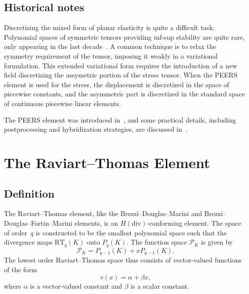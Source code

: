 

\subsection{Historical notes}

Discretizing the mixed form of planar elasticity is quite a difficult
task.  Polynomial spaces of symmetric tensors providing inf-sup
stability are quite rare, only appearing in the last
decade~\cite{ArnoldWinther2002}. A common technique is to relax the
symmetry requirement of the tensor, imposing it weakly in a
variational formulation.  This extended variational form requires the
introduction of a new field discretizing the assymetric portion of the
stress tensor.  When the PEERS element is used for the stress, the
displacement is discretized in the space of piecewise constants, and
the asymmetric part is discretized in the standard space of continuous
piecewise linear elements.

The PEERS element was introduced in~\cite{ArnoldBrezzi1974aDouglas1984}, and
some practical details, including postprocessing and hybridization
strategies, are discussed in~\cite{ArnoldBrezzi1974a1985}.

\newpage

\section{The Raviart--Thomas Element}
\label{sec:raviartthomas}

\subsection{Definition}

The Raviart--Thomas element, like the Brezzi--Douglas--Marini and
Brezzi--Douglas--Fortin--Marini elements, is an \( H(\mathrm{div})
\)-conforming element.  The space of order~$q$ is constructed to be
the smallest polynomial space such that the divergence maps \(
\mathrm{RT}_q(K) \) onto \( P_q(K) \). The function space
$\mathcal{P}_K$ is given by
\begin{displaymath}
  \mathcal{P}_K = P_{q-1}(K) + x P_{q-1}(K).
\end{displaymath}
The lowest order Raviart--Thomas space thus consists of vector-valued
functions of the form
\begin{displaymath}
  v(x) = \alpha + \beta x,
\end{displaymath}
where $\alpha$ is a vector-valued constant and $\beta$ is a scalar
constant.

